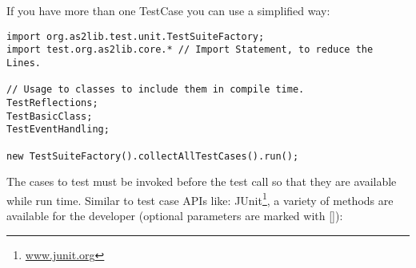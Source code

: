 If you have more than one TestCase you can use a simplified way:
\begin{lstlisting}[frame=single]
import org.as2lib.test.unit.TestSuiteFactory;
import test.org.as2lib.core.* // Import Statement, to reduce the Lines.

// Usage to classes to include them in compile time.
TestReflections;
TestBasicClass;
TestEventHandling;

new TestSuiteFactory().collectAllTestCases().run();
\end{lstlisting}


The cases to test must be invoked before the test call so that they are available while run time.
Similar to test case APIs like: JUnit\footnote{\href{http://www.junit.org}{www.junit.org}}, a variety of methods are available for the developer (optional parameters are marked with []):

